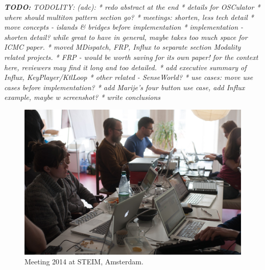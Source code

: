 \documentclass{article}
\title{\papertitle}
\newcommand{\todo}[1] {\emph{\textbf{TODO:} #1}}
\begin{document}
%
\capstartfalse
\maketitle
\capstarttrue
%
\todo{ {TODOLITY:} (adc):
* redo abstract at the end 
* details for OSCulator
* where should multiton pattern section go?
* meetings: shorten, less tech detail
* move concepts - islands \& bridges before implementation
* implementation - shorten detail? while great to have in general, maybe takes too much space for ICMC paper.
* moved MDispatch, FRP, Influx to separate section {Modality related projects}.
* FRP - would be worth saving for its own paper! for the context here, reviewers may find it long and too detailed.
* add executive summary of Influx, KeyPlayer/KtlLoop
* other related - SenseWorld? 
* use cases: move use cases before implementation? 
* add Marije's four button use case, add Influx example, maybe w screenshot?
* write conclusions
}

\begin{abstract}

The Modality Toolkit aims to improve and facilitate the use of digital technology within interactive sound art and music. 
Written in SuperCollider (SC), it simplifies the creation of individual electronic instruments by combining custom sound engines with off-the-shelf controllers. 
To this end, a common code interface, |MKtl|, is used to connect controllers from various sources and protocols. 
Currently, HID and MIDI are supported; GUI-based interfaces can be created on the fly from interface descriptions.

This paper gives an overview on the interpretation of modality as seen by a group of sound artists and researchers.
Furthermore, it describes the interdisciplinary approach on giving birth to a toolkit written for and by electronic musicians.
\end{abstract}

\begin{figure}[h]
	\centering
		\includegraphics[width=.9\columnwidth]{../media/20140331-IMG_5976.jpg}
	\caption{Meeting 2014 at STEIM, Amsterdam.}
	\label{fig:media_20140331-IMG_5976}
\end{figure}
\end{document}
